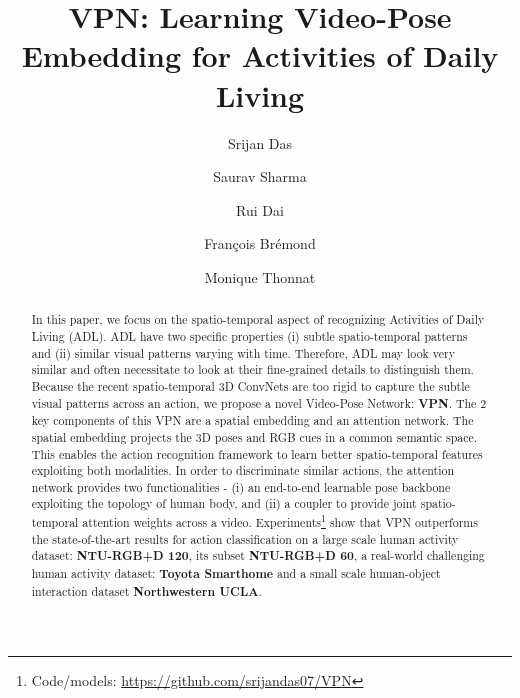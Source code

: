 \documentclass[runningheads]{llncs}
\begin{document}
\pagestyle{headings}
\mainmatter
\def\ECCVSubNumber{720}  

\title{VPN: Learning Video-Pose Embedding for Activities of Daily Living} 

\begin{comment}
\titlerunning{ECCV-20 submission ID \ECCVSubNumber} 
\authorrunning{ECCV-20 submission ID \ECCVSubNumber} 
\author{Anonymous ECCV submission}
\institute{Paper ID \ECCVSubNumber}
\end{comment}


\author{Srijan Das \and
Saurav Sharma \and
Rui Dai \and Fran\c cois Br\'emond \and Monique Thonnat}
\maketitle

\begin{abstract}
   In this paper, we focus on the spatio-temporal aspect of recognizing Activities of Daily Living (ADL).
   ADL have two specific properties (i) subtle spatio-temporal patterns and (ii) similar visual patterns varying with time. Therefore, ADL may look very similar and often necessitate to look at their fine-grained details to distinguish them. Because the recent spatio-temporal 3D ConvNets are too rigid to capture the subtle visual patterns across an action, we propose a novel Video-Pose Network: \textbf{VPN}. 
   The 2 key components of this VPN are a spatial embedding and an attention network. The spatial embedding projects the 3D poses and RGB cues in a common semantic space. This enables the action recognition framework to learn better spatio-temporal features exploiting both modalities. In order to discriminate similar actions, the attention network provides two functionalities - (i) an end-to-end learnable pose backbone exploiting the topology of human body, and (ii) a coupler to provide joint spatio-temporal attention weights across a video.
   Experiments\footnote{Code/models: \small{\url{https://github.com/srijandas07/VPN}}} show that VPN outperforms the state-of-the-art results for action classification on a large scale human activity dataset: \textbf{NTU-RGB+D 120}, its subset \textbf{NTU-RGB+D 60}, a real-world challenging human activity dataset: \textbf{Toyota Smarthome} and a small scale human-object interaction dataset \textbf{Northwestern UCLA}.

\end{abstract}
\end{document}

